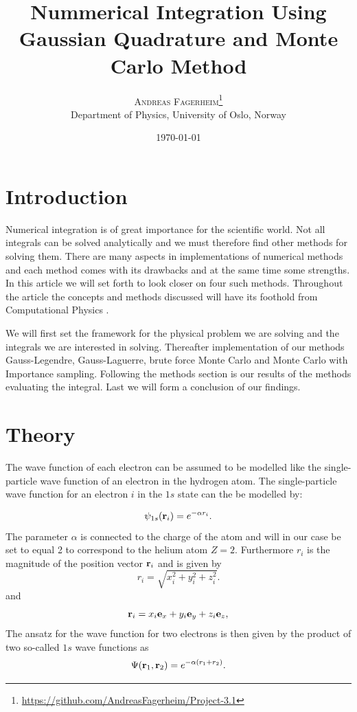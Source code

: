 \documentclass[twoside,twocolumn]{article}
\title{Nummerical Integration Using Gaussian Quadrature and Monte Carlo Method } %
\author{%
\textsc{Andreas Fagerheim}\thanks{\url{https://github.com/AndreasFagerheim/Project-3.1}} \\[1ex] %
\normalsize Department of Physics, University of Oslo, Norway \\ %
}
\date{\today} %
\begin{document}
\maketitle


\section{Introduction}
Numerical integration is of great importance for the scientific world. Not all integrals can be solved analytically and we must therefore find other methods for solving them. There are many aspects in implementations of numerical methods and each method comes with its drawbacks and at the same time some strengths. In this article we will set forth to look closer on four such methods. Throughout the article the concepts and methods discussed will have its foothold from Computational Physics \cite{Hjorth-Jensen:2015dg}. 

We will first set the framework for the physical problem we are solving and the integrals we are interested in solving. Thereafter implementation of our methods Gauss-Legendre, Gauss-Laguerre, brute force Monte Carlo and Monte Carlo with Importance sampling. Following the methods section is our results of the methods evaluating the integral. Last we will form a conclusion of our findings. 
\section{Theory}

The wave function of each electron can be assumed to be modelled like
the single-particle wave function of an electron in the hydrogen
atom. The single-particle wave function for an electron $i$ in the
$1s$ state can the be modelled by:



\begin{equation}
		\psi_{1s}({\bf r}_i)  =   e^{-\alpha r_i}.
\end{equation}
The parameter $\alpha$ is connected to the charge of the atom and will in our case be set to equal 2 to correspond to the helium atom $Z = 2$. Furthermore $r_i$ is the magnitude of the position vector ${\bf r}_i$ and is given by
\[
r_i = \sqrt{x_i^2+y_i^2+z_i^2}.
\]
and
\[
   {\bf r}_i =  x_i {\bf e}_x + y_i {\bf e}_y +z_i {\bf e}_z ,
\]
The ansatz for the wave function for two electrons is then given by the product of two 
so-called 
$1s$ wave functions as 
\[
   \Psi({\bf r}_1,{\bf r}_2)  =   e^{-\alpha (r_1+r_2)}.
\]
\end{document}
